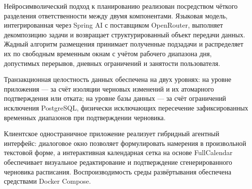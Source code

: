 Нейросимволический подход к планированию реализован посредством чёткого разделения ответственности между двумя компонентами. Языковая модель, интегрированная через Spring AI с поставщиком OpenRouter, выполняет декомпозицию задачи и возвращает структурированный объект передачи данных. Жадный алгоритм размещения принимает полученные подзадачи и распределяет их по свободным временным окнам с учётом рабочего диапазона дня, допустимых перерывов, дневных ограничений и занятости пользователя.

Транзакционная целостность данных обеспечена на двух уровнях: на уровне приложения --- за счёт изоляции черновых изменений и их атомарного подтверждения или отката; на уровне базы данных --- за счёт ограничений исключения PostgreSQL, физически исключающих пересечение зафиксированных временных диапазонов при подтверждении черновика.

Клиентское одностраничное приложение реализует гибридный агентный интерфейс: диалоговое окно позволяет формулировать намерения в произвольной текстовой форме, а интерактивная календарная сетка на основе FullCalendar обеспечивает визуальное редактирование и подтверждение сгенерированного черновика расписания. Воспроизводимость среды развёртывания обеспечена средствами Docker Compose.
